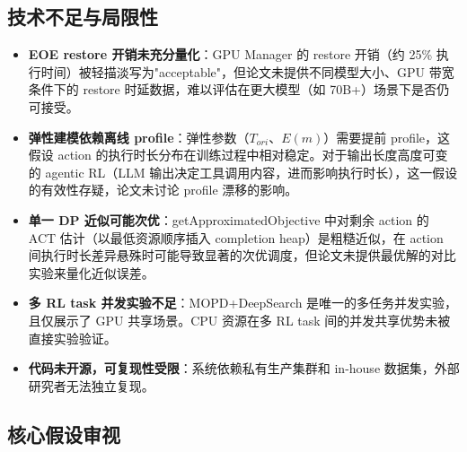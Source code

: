 \documentclass[11pt, a4paper]{article}
\newcommand{\rmark}[1]{\textcolor{CriticalRed!80!black}{\bfseries #1}}
\begin{document}
\subsection{技术不足与局限性}

\begin{weaknessbox}
\begin{itemize}
  \item \rmark{EOE restore 开销未充分量化}：GPU Manager 的 restore 开销（约 25\% 执行时间）被轻描淡写为"acceptable"，但论文未提供不同模型大小、GPU 带宽条件下的 restore 时延数据，难以评估在更大模型（如 70B+）场景下是否仍可接受。

  \item \rmark{弹性建模依赖离线 profile}：弹性参数（$T_{\mathit{ori}}$、$E(m)$）需要提前 profile，这假设 action 的执行时长分布在训练过程中相对稳定。对于输出长度高度可变的 agentic RL（LLM 输出决定工具调用内容，进而影响执行时长），这一假设的有效性存疑，论文未讨论 profile 漂移的影响。

  \item \rmark{单一 DP 近似可能次优}：getApproximatedObjective 中对剩余 action 的 ACT 估计（以最低资源顺序插入 completion heap）是粗糙近似，在 action 间执行时长差异悬殊时可能导致显著的次优调度，但论文未提供最优解的对比实验来量化近似误差。

  \item \rmark{多 RL task 并发实验不足}：MOPD+DeepSearch 是唯一的多任务并发实验，且仅展示了 GPU 共享场景。CPU 资源在多 RL task 间的并发共享优势未被直接实验验证。

  \item \rmark{代码未开源，可复现性受限}：系统依赖私有生产集群和 in-house 数据集，外部研究者无法独立复现。
\end{itemize}
\end{weaknessbox}

\subsection{核心假设审视}
\end{document}
